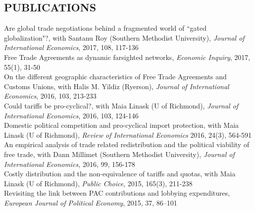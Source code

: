 \documentclass[11pt]{res}
\begin{document}
\begin{resume}
\section{PUBLICATIONS}\vspace{1.5mm}
{Are global trade negotiations behind a fragmented world of ``gated globalization"?}, with Santanu Roy (Southern Methodist University), \emph{Journal of International Economics}, 2017, 108, 117-136\vspace{1.5mm}\\
{ Free Trade Agreements as dynamic farsighted networks}, \emph{Economic Inquiry}, 2017, 55(1), 31-50\vspace{1.5mm}\\
{On the different geographic characteristics of Free Trade Agreements and Customs Unions}, with Halis M. Yildiz (Ryerson), \emph{Journal of International Economics}, 2016, 103, 213-233 \vspace{1.5mm}\\
{Could tariffs be pro-cyclical?}, with Maia Linask (U of Richmond), \emph{Journal of International Economics}, 2016, 103, 124-146 \vspace{1.5mm}\\
{Domestic political competition and pro-cyclical import protection}, with Maia Linask (U of Richmond), \emph{Review of International Economics} 2016, 24(3), 564-591\vspace{1.5mm}\\
{An empirical analysis of trade related redistribution and the political viability of free trade}, with Dann Millimet (Southern Methodist University), \emph{Journal of International Economics}, 2016, 99, 156-178 \vspace{1.5mm}\\
{Costly distribution and the non-equivalence of tariffs and quotas}, with Maia Linask (U of Richmond), \emph{Public Choice}, 2015, 165(3), 211-238 \vspace{1.5mm}\\
{Revisiting the link between PAC contributions and lobbying expenditures, \emph{European Journal of Political Economy}}, 2015, 37, 86--101





\end{resume}
\end{document}
